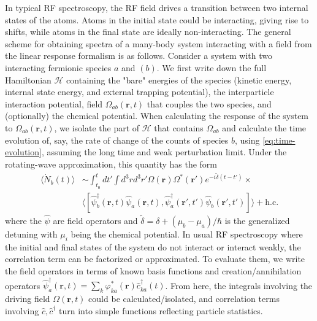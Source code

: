 \documentclass[reprint,
nofootinbib,
amsmath,amssymb,
aps]{revtex4-1}
\begin{document}
In typical RF spectroscopy, the RF field drives a transition between two internal states of the atoms. Atoms in the initial state could be interacting, giving rise to shifts, while atoms in the final state are ideally non-interacting.  The general scheme for obtaining spectra of a many-body system interacting with a field from the linear response formalism is as follows. Consider a system with two interacting fermionic species $a$ and $(b)$. We first write down the full Hamiltonian $\mathcal{H}$ containing the "bare" energies of the species (kinetic energy, internal state energy, and external trapping potential), the interparticle interaction potential, field $\Omega_{ab}(\mathbf{r},t)$ that couples the two species, and (optionally) the chemical potential. When calculating the response of the system to $\Omega_{ab}(\mathbf{r},t)$, we isolate the part of $\mathcal{H}$ that contains $\Omega_{ab}$ and calculate the time evolution of, say, the rate of change of the counts of species $b$, using \eqref{eq:time-evolution}, assuming the long time and weak perturbation limit. Under the rotating-wave approximation, this quantity has the form
\begin{align*}
\langle \dot N_b(t) \rangle &\sim \int_{t_0}^t dt' \int d^3 r  d^3 r' \Omega(\mathbf{r}) \Omega^*(\mathbf{r}') e^{-i \widetilde{\delta}(t-t')}  \times \\
& \langle [\hat{\psi}_b^\dagger (\mathbf{r},t) \hat{\psi}_a (\mathbf{r},t), \hat{\psi}_a^\dagger (\mathbf{r}',t') \hat{\psi}_b (\mathbf{r}',t') ] \rangle+ \text{h.c.}
\end{align*} 
where the $\hat{\psi}$ are field operators and $\widetilde{\delta} = \delta + (\mu_b - \mu_a)/\hbar$ is the generalized detuning with $\mu_i$ being the chemical potential. In usual RF spectroscopy where the initial and final states of the system do not interact or interact weakly, the correlation term can be factorized or approximated. To evaluate them, we write the field operators in terms of known basis functions and creation/annihilation operators $\hat{\psi}_a^\dagger(\mathbf{r},t) = \sum_k \varphi^*_{ka}(\mathbf{r}) \hat{c}_{ka}^\dagger(t)$. From here, the integrals involving the driving field $\Omega(\mathbf{r},t)$ could be calculated/isolated, and correlation terms involving $\hat{c},\hat{c}^\dagger$ turn into simple functions reflecting particle statistics.  
\end{document}
